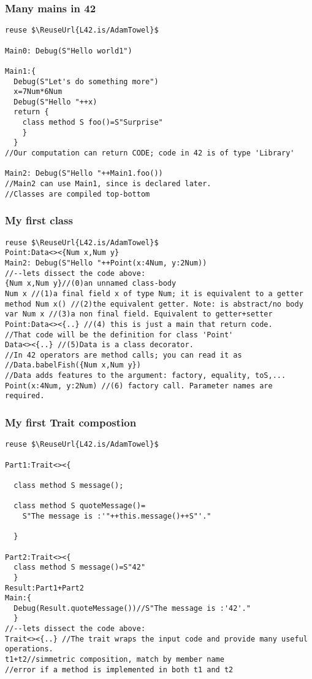 \begin{frame}[fragile]
\frametitle{Many mains in 42}
\begin{NiceCode}{59ex}{0.8}
\begin{lstlisting}
reuse $\ReuseUrl{L42.is/AdamTowel}$

Main0: Debug(S"Hello world1")

Main1:{
  Debug(S"Let's do something more")  
  x=7Num*6Num
  Debug(S"Hello "++x)
  return {
    class method S foo()=S"Surprise"
    }
  }
//Our computation can return CODE; code in 42 is of type 'Library'

Main2: Debug(S"Hello "++Main1.foo())
//Main2 can use Main1, since is declared later.
//Classes are compiled top-bottom
\end{lstlisting}
\end{NiceCode}
\end{frame}

\begin{frame}[fragile]
\frametitle{My first class}
\begin{NiceCode}{59ex}{0.8}
\begin{lstlisting}
reuse $\ReuseUrl{L42.is/AdamTowel}$
Point:Data<><{Num x,Num y}
Main2: Debug(S"Hello "++Point(x:4Num, y:2Num))
//--lets dissect the code above:
{Num x,Num y}//(0)an unnamed class-body
Num x //(1)a final field x of type Num; it is equivalent to a getter
method Num x() //(2)the equivalent getter. Note: is abstract/no body
var Num x //(3)a non final field. Equivalent to getter+setter
Point:Data<><{..} //(4) this is just a main that return code.
//That code will be the definition for class 'Point'
Data<><{..} //(5)Data is a class decorator.
//In 42 operators are method calls; you can read it as 
//Data.babelFish({Num x,Num y})
//Data adds features to the argument: factory, equality, toS,...
Point(x:4Num, y:2Num) //(6) factory call. Parameter names are required.
\end{lstlisting}
\end{NiceCode}
\end{frame}


\begin{frame}[fragile]
\frametitle{My first Trait compostion}
\begin{NiceCode}{59ex}{0.8}
\begin{lstlisting}
reuse $\ReuseUrl{L42.is/AdamTowel}$

Part1:Trait<><{

  class method S message();

  class method S quoteMessage()=
    S"The message is :'"++this.message()++S"'."

  }

Part2:Trait<><{
  class method S message()=S"42"
  }
Result:Part1+Part2
Main:{
  Debug(Result.quoteMessage())//S"The message is :'42'."
  }
//--lets dissect the code above:
Trait<><{..} //The trait wraps the input code and provide many useful operations.
t1+t2//simmetric composition, match by member name
//error if a method is implemented in both t1 and t2
\end{lstlisting}
\end{NiceCode}
\end{frame}

